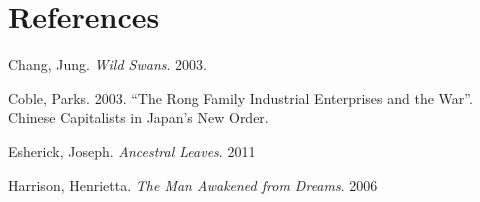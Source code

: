 \section*{References}

\bibent Chang, Jung. \textit{Wild Swans}. 2003.

\bibent Coble, Parks. 2003. ``The Rong Family Industrial Enterprises and the
War''. Chinese Capitalists in Japan's New Order.

\bibent Esherick, Joseph. \textit{Ancestral Leaves}. 2011

\bibent Harrison, Henrietta. \textit{The Man Awakened from Dreams}. 2006

